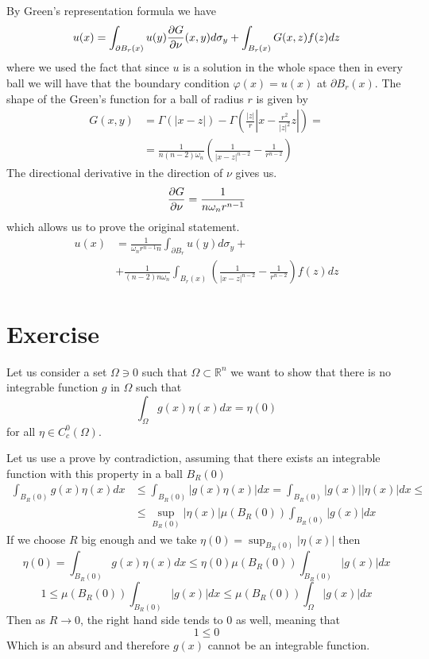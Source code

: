 \documentclass{article}
\newcommand{\R}{\mathbb{R}}
\begin{document}
By Green's representation formula we have
\[
    u(x) = \int_{\partial B_r(x)} u(y) \pdv{G}{\nu} (x,y) d \sigma_y + \int_{B_r(x)} G (x,z) f(z) dz
\]
where we used the fact that since $u$ is a solution in the whole space then in every ball we will have that the boundary condition $\varphi (x) = u (x)$ at $\partial B_r(x)$. The shape of the Green's function for a ball of radius $r$ is given by
\[
    \begin{split}
        G(x, y) &= \Gamma (|x-z|) - \Gamma \left( \frac{|z|}{r} \left|x-\frac{r^2}{|z|^2}z \right| \right) = \\
        & = \frac{1}{n(n-2) \omega_n} \left( \frac{1}{|x-z|^{n-2}} -\frac{1}{r^{n-2}} \right)
    \end{split}
\]
The directional derivative in the direction of $\nu$ gives us.
\[
    \pdv{G}{\nu} = \frac{1}{n\omega_n r^{n-1}}
\]
which allows us to prove the original statement.
\[
    \begin{split}
        u(x) &= \frac{1}{\omega_n r^{n-1}n} \int_{\partial B_r} u(y) d\sigma_y +\\
        & + \frac{1}{(n-2) n \omega_n} \int_{B_r(x)} \left( \frac{1}{|x-z|^{n-2}} -\frac{1}{r^{n-2}} \right) f(z)dz
    \end{split}
\]
\section{Exercise}
Let us consider a set $\Omega \ni 0$ such that $\Omega \subset \R^n$ we want to show that there is no integrable function $g$ in $\Omega$ such that 
\[
    \int_\Omega g(x) \eta(x) dx = \eta(0)
\]
for all $\eta \in C^0_c(\Omega)$.

Let us use a prove by contradiction, assuming that there exists an integrable function with this property in a ball $B_R (0)$
\[
    \begin{split}
        \int_{B_R(0)} g(x) \eta(x) dx &\leq \int_{B_R(0)} |g(x) \eta(x)| dx = \int_{B_R(0)} |g(x)||\eta(x)| dx \leq\\
        & \leq \sup_{B_R(0)} |\eta(x)| \mu (B_R(0)) \int_{B_R(0)} |g(x)|dx
    \end{split}
\]
If we choose $R$ big enough and we take $\eta(0) = \sup_{B_R(0)}|\eta(x)|$ then
\[
    \eta(0) = \int_{B_R(0)} g(x) \eta(x) dx \leq \eta(0) \mu (B_R(0)) \int_{B_R(0)} |g(x)|dx
\]
\[
    1 \leq \mu(B_R(0))\int_{B_R(0)} |g(x)|dx \leq \mu(B_R(0)) \int_{\Omega} |g(x)|dx
\]
Then as $R \to 0$, the right hand side tends to $0$ as well, meaning that 
\[
    1 \leq 0
\]
Which is an absurd and therefore $g(x)$ cannot be an integrable function.
\end{document}
